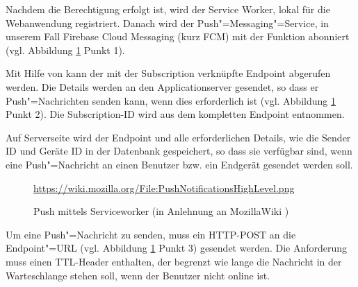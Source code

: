 Nachdem die Berechtigung erfolgt ist, wird der Service Worker, lokal  für die Webanwendung registriert. 
Danach wird der Push"=Messaging"=Service, in unserem Fall \glqq Firebase Cloud Messaging\grqq{} (kurz FCM) mit der Funktion  abonniert (vgl. Abbildung \ref{image_konzeption_architektur-serviceworker-push} Punkt 1). 

Mit Hilfe von  kann der mit der Subscription verknüpfte Endpoint abgerufen werden. Die Details werden an den Applicationserver gesendet, so dass er Push"=Nachrichten senden kann, wenn dies erforderlich ist (vgl. Abbildung \ref{image_konzeption_architektur-serviceworker-push} Punkt 2). Die Subscription-ID wird aus dem kompletten Endpoint entnommen. 

Auf Serverseite wird der Endpoint und alle erforderlichen Details, wie die Sender ID und Geräte ID in der Datenbank gespeichert, so dass sie verfügbar sind, wenn eine Push"=Nachricht an einen Benutzer bzw. ein Endgerät gesendet werden soll. \\

\begin{figure}[htp] 
\caption{Push mittels Serviceworker (in Anlehnung an MozillaWiki \cite{MOZ_WIKI})}
\quelle\url{https://wiki.mozilla.org/File:PushNotificationsHighLevel.png}
\label{image_konzeption_architektur-serviceworker-push}
\end{figure} 

Um eine Push"=Nachricht zu senden, muss ein HTTP-POST an die Endpoint"=URL (vgl. Abbildung \ref{image_konzeption_architektur-serviceworker-push} Punkt 3) gesendet werden. Die Anforderung muss einen TTL-Header enthalten, der begrenzt wie lange die Nachricht in der Warteschlange stehen soll, wenn der Benutzer nicht online ist.


